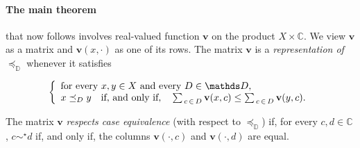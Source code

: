 \documentclass[12pt,a4paper,twoside]{article}
\newcommand{\mbbd}{{\mathds D}}
\newcommand{\mbbc}{{\mathds C}}
\begin{document}
\paragraph{The main theorem\hskip-5pt} that now follows involves real-valued
function $ \mathbf{v} $ on the product $X \times \mbbc $. We view $\mathbf{v}$
as a matrix and $ \mathbf{v} ( x , \cdot )$ as one of its rows.  The matrix
$ \mathbf{v} $ is a \emph{representation of $ \preceq _{ \mbbd }$} whenever it
satisfies
\label{sec-main}
 \begin{linenomath*} 
\begin{equation}\notag\label{eq-rep-main}
  \left\{
  \begin{array}{l}
    \text{for every $ x , y \in X$ and every $ D \in \mbbd $,}\\
    x \preceq _ D y \quad \text{if, and only if,} \quad \sum _ { \, c \,\in\, D} \mathbf{v} ( x
    , c ) \leq \sum _ {\, c \,\in\, D } \mathbf{v} ( y , c )  .
  \end{array}\right.
\end{equation}
\end{linenomath*}
The matrix $\mathbf{v}$ \emph{respects case equivalence} (with respect to
  $\preceq_{\mbbd}$) if, for every $c,d\in \mbbc$, $c \sim^{\star} d$ if,
and only if, the columns $\mathbf{v}(\cdot,c)$ and $ \mathbf{v}(\cdot,d)$ are equal.
\end{document}
